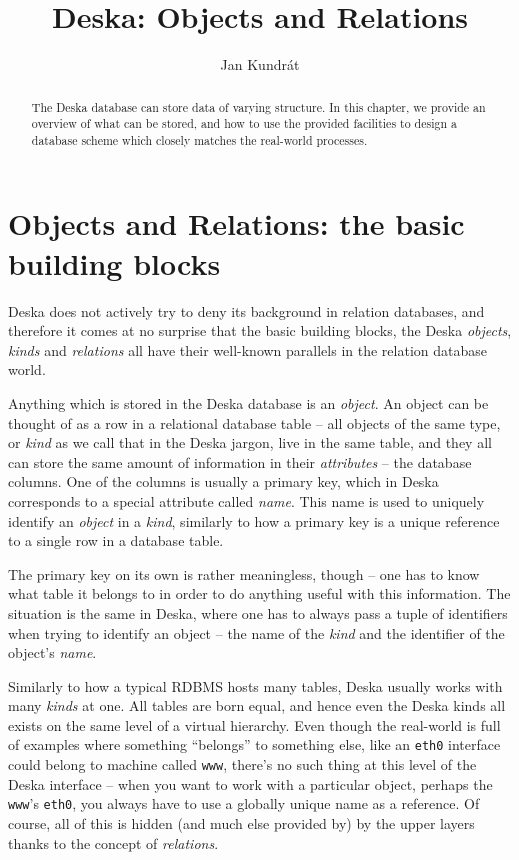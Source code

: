 \documentclass{article}
\begin{document}
\title{Deska: Objects and Relations}

\author{Jan Kundrát}

\maketitle

\newcommand{\deskaFuncRef}[1]{{\tt {#1}}}

\begin{abstract}
The Deska database can store data of varying structure.  In this chapter, we provide an overview of what can be stored,
and how to use the provided facilities to design a database scheme which closely matches the real-world processes.
\end{abstract}

\section{Objects and Relations: the basic building blocks}

Deska does not actively try to deny its background in relation databases, and therefore it comes at no surprise that the
basic building blocks, the Deska {\em objects}, {\em kinds} and {\em relations} all have their well-known parallels in
the relation database world.

Anything which is stored in the Deska database is an {\em object}. An object can be thought of as a row in a relational
database table -- all objects of the same type, or {\em kind} as we call that in the Deska jargon, live in the same
table, and they all can store the same amount of information in their {\em attributes} -- the database
columns.  One of the columns is usually a primary key, which in Deska corresponds to a special attribute called {\em
name}.  This name is used to uniquely identify an {\em object} in a {\em kind}, similarly to how a primary key is a
unique reference to a single row in a database table.

The primary key on its own is rather meaningless, though -- one has to know what table it belongs to in order to do
anything useful with this information.  The situation is the same in Deska, where one has to always pass a tuple of
identifiers when trying to identify an object -- the name of the {\em kind} and the identifier of the object's {\em
name}.

Similarly to how a typical RDBMS hosts many tables, Deska usually works with many {\em kinds} at one.  All tables are
born equal, and hence even the Deska kinds all exists on the same level of a virtual hierarchy.  Even though the
real-world is full of examples where something ``belongs'' to something else, like an {\tt eth0} interface could belong
to machine called {\tt www}, there's no such thing at this level of the Deska interface -- when you want to work with a
particular object, perhaps the {\tt www}'s {\tt eth0}, you always have to use a globally unique name as a reference.
Of course, all of this is hidden (and much else provided by) by the upper layers thanks to the concept of {\em
relations}.
\end{document}
